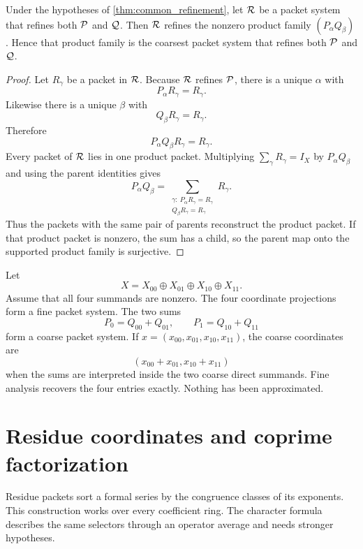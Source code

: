 \begin{proposition}\label{prop:coarsest_common_refinement}
Under the hypotheses of \cref{thm:common_refinement}, let $\mathcal R$ be a packet system that refines both $\mathcal P$ and $\mathcal Q$.  Then $\mathcal R$ refines the nonzero product family $(P_\alpha Q_\beta)$.  Hence that product family is the coarsest packet system that refines both $\mathcal P$ and $\mathcal Q$.
\end{proposition}

\begin{proof}
Let $R_\gamma$ be a packet in $\mathcal R$.  Because $\mathcal R$ refines $\mathcal P$, there is a unique $\alpha$ with
\[
P_\alpha R_\gamma=R_\gamma.
\]
Likewise there is a unique $\beta$ with
\[
Q_\beta R_\gamma=R_\gamma.
\]
Therefore
\[
P_\alpha Q_\beta R_\gamma=R_\gamma.
\]
Every packet of $\mathcal R$ lies in one product packet. Multiplying $\sum_\gamma R_\gamma=I_X$ by $P_\alpha Q_\beta$ and using the parent identities gives
\[
P_\alpha Q_\beta
=\sum_{\substack{\gamma:\ P_\alpha R_\gamma=R_\gamma\\Q_\beta R_\gamma=R_\gamma}}R_\gamma.
\]
Thus the packets with the same pair of parents reconstruct the product packet. If that product packet is nonzero, the sum has a child, so the parent map onto the supported product family is surjective.
\end{proof}

\begin{example}\label{ex:two_level_split}
Let
\[
X=X_{00}\oplus X_{01}\oplus X_{10}\oplus X_{11}.
\]
Assume that all four summands are nonzero. The four coordinate projections form a fine packet system.  The two sums
\[
P_0=Q_{00}+Q_{01},
\qquad
P_1=Q_{10}+Q_{11}
\]
form a coarse packet system.  If $x=(x_{00},x_{01},x_{10},x_{11})$, the coarse coordinates are
\[
(x_{00}+x_{01},x_{10}+x_{11})
\]
when the sums are interpreted inside the two coarse direct summands.  Fine analysis recovers the four entries exactly.  Nothing has been approximated.
\end{example}

\section{Residue coordinates and coprime factorization}\label{sec:residue}

Residue packets sort a formal series by the congruence classes of its exponents. This construction works over every coefficient ring. The character formula describes the same selectors through an operator average and needs stronger hypotheses.

